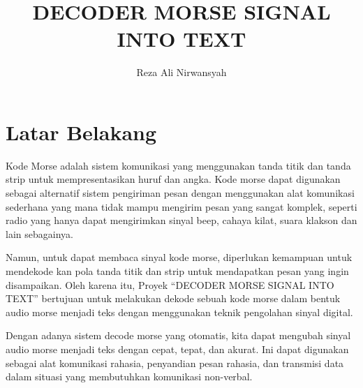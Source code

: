 \documentclass[]{article}
\title{DECODER MORSE SIGNAL INTO TEXT}
\author{Reza Ali Nirwansyah}
\begin{document}
\maketitle

\begin{abstract}

\end{abstract}

\section{Latar Belakang}

Kode Morse adalah sistem komunikasi yang menggunakan tanda titik dan tanda strip untuk mempresentasikan huruf dan angka. Kode morse dapat digunakan sebagai alternatif sistem pengiriman pesan dengan menggunakan alat komunikasi sederhana yang mana tidak mampu mengirim pesan yang sangat komplek, seperti radio yang hanya dapat mengirimkan sinyal beep, cahaya kilat, suara klakson dan lain sebagainya.

Namun, untuk dapat membaca sinyal kode morse, diperlukan kemampuan untuk mendekode kan pola tanda titik dan strip untuk mendapatkan pesan yang ingin disampaikan. Oleh karena itu, Proyek “DECODER MORSE SIGNAL INTO TEXT” bertujuan untuk melakukan dekode sebuah kode morse dalam bentuk audio morse menjadi teks dengan menggunakan teknik pengolahan sinyal digital.

Dengan adanya sistem decode morse yang otomatis, kita dapat mengubah sinyal audio morse menjadi teks dengan cepat, tepat, dan akurat. Ini dapat digunakan sebagai alat komunikasi rahasia, penyandian pesan rahasia, dan transmisi data dalam situasi yang membutuhkan komunikasi non-verbal.
\end{document}

